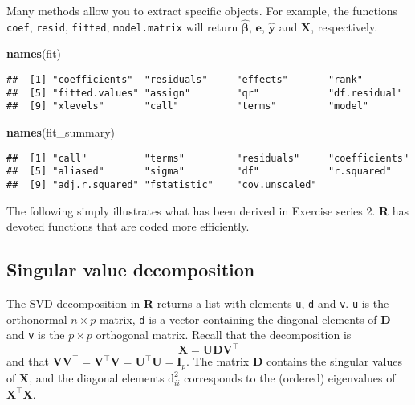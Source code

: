\documentclass[]{book}
\newenvironment{Shaded}{\begin{snugshade}}{\end{snugshade}}
\newcommand{\KeywordTok}[1]{\textcolor[rgb]{0.13,0.29,0.53}{\textbf{#1}}}
\newcommand{\NormalTok}[1]{#1}
\theoremstyle{definition}
\theoremstyle{definition}
\theoremstyle{definition}
\theoremstyle{remark}
\begin{document}
Many methods allow you to extract specific objects. For example, the functions \texttt{coef}, \texttt{resid}, \texttt{fitted}, \texttt{model.matrix} will return \(\hat{\boldsymbol{\beta}}\), \(\boldsymbol{e}\), \(\hat{\boldsymbol{y}}\) and \(\mathbf{X}\), respectively.

\begin{Shaded}
\begin{Highlighting}[]
\KeywordTok{names}\NormalTok{(fit)}
\end{Highlighting}
\end{Shaded}

\begin{verbatim}
##  [1] "coefficients"  "residuals"     "effects"       "rank"         
##  [5] "fitted.values" "assign"        "qr"            "df.residual"  
##  [9] "xlevels"       "call"          "terms"         "model"
\end{verbatim}

\begin{Shaded}
\begin{Highlighting}[]
\KeywordTok{names}\NormalTok{(fit_summary)}
\end{Highlighting}
\end{Shaded}

\begin{verbatim}
##  [1] "call"          "terms"         "residuals"     "coefficients" 
##  [5] "aliased"       "sigma"         "df"            "r.squared"    
##  [9] "adj.r.squared" "fstatistic"    "cov.unscaled"
\end{verbatim}

The following simply illustrates what has been derived in Exercise series 2. \textbf{R} has devoted functions that are coded more efficiently.

\hypertarget{singular-value-decomposition}{%
\subsection{Singular value decomposition}\label{singular-value-decomposition}}

The SVD decomposition in \textbf{R} returns a list with elements \texttt{u}, \texttt{d} and \texttt{v}. \texttt{u} is the orthonormal \(n \times p\) matrix, \texttt{d} is a vector containing the diagonal elements of \(\mathbf{D}\) and \texttt{v} is the \(p \times p\) orthogonal matrix. Recall that the decomposition is
\[\mathbf{X} = \mathbf{UDV}^\top\]
and that \(\mathbf{VV}^\top= \mathbf{V}^\top\mathbf{V}=\mathbf{U}^\top\mathbf{U}=\mathbf{I}_p\). The matrix \(\mathbf{D}\) contains the singular values of \(\mathbf{X}\), and the diagonal elements \(\mathrm{d}_{ii}^2\) corresponds to the (ordered) eigenvalues of \(\mathbf{X}^\top\mathbf{X}\).
\end{document}
